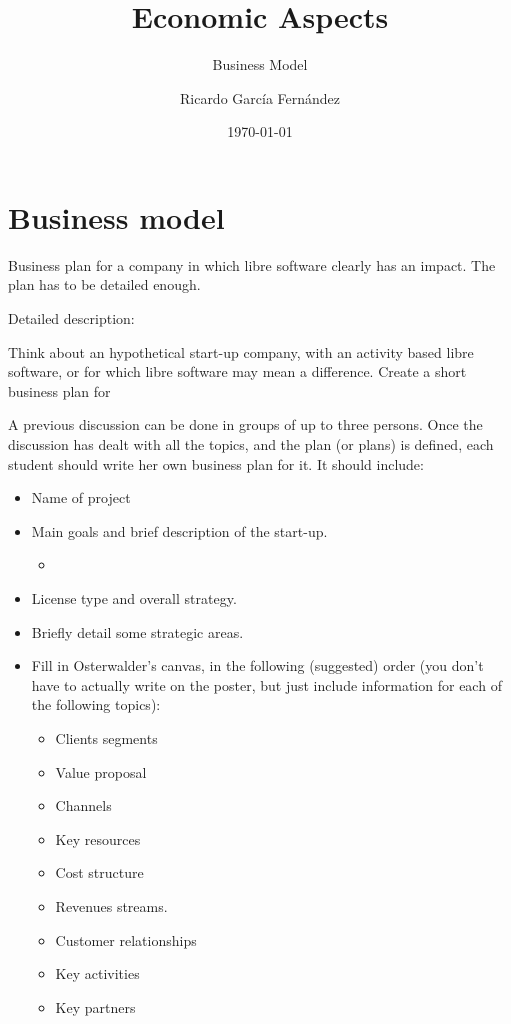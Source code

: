 \documentclass[11pt]{scrartcl}
\title{\textbf{Economic Aspects}}
\subtitle{Business Model}
\author{Ricardo Garc\'ia Fern\'andez}
\date{\today}
\begin{document}
\maketitle

\section{Business model}

Business plan for a company in which libre software clearly has an impact. The plan has to be detailed enough. 

Detailed description:

Think about an hypothetical start-up company, with an activity based libre software, or for which libre software may mean a difference. Create a short business plan for 

A previous discussion can be done in groups of up to three persons. Once the discussion has dealt with all the topics, and the plan (or plans) is defined, each student should write her own business plan for it. It should include:

\begin{itemize}
    \item Name of project
    \item Main goals and brief description of the start-up.
        \begin{itemize}
            \item 
        \end{itemize}
    \item License type and overall strategy.
    \item Briefly detail some strategic areas.

    \item Fill in Osterwalder’s canvas, in the following (suggested) order (you don’t have to actually write on the poster, but just include information for each of the following topics):
    \begin{itemize}
        \item Clients segments
        \item Value proposal
        \item Channels
        \item Key resources
        \item Cost structure
        \item Revenues streams.
        \item Customer relationships
        \item Key activities
        \item Key partners
    \end{itemize}
\end{itemize}
\end{document}
